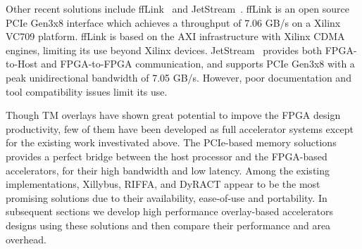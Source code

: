 Other recent solutions include ffLink~\cite{de2016fflink} and JetStream~\cite{vesper2016jetstream}. 
ffLink is an open source PCIe Gen3x8 interface which achieves a throughput of 7.06 GB/s on a Xilinx VC709 platform. 
ffLink is based on the AXI infrastructure with Xilinx CDMA engines, limiting its use beyond Xilinx devices. 
JetStream~\cite{vesper2016jetstream} provides both FPGA-to-Host and FPGA-to-FPGA communication, and supports PCIe Gen3x8  with a peak unidirectional bandwidth of 7.05 GB/s. 
However, poor documentation and tool compatibility issues limit its use.

Though TM overlays have shown great potential to impove the FPGA design productivity, few of them have been developed as full accelerator systems except for the existing work investivated above. 
The PCIe-based memory soluctions provides a perfect bridge between the host processor and the FPGA-based accelerators, for their high bandwidth and low latency. 
Among the existing implementations, Xillybus, RIFFA, and DyRACT appear to be the most promising solutions due to their availability, ease-of-use and portability. 
In subsequent sections we develop high performance overlay-based accelerators designs using these solutions and then compare their performance and area overhead.


